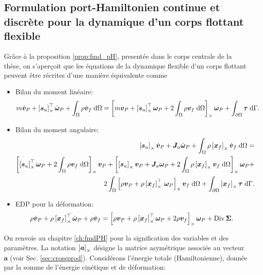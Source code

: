 \subsection*{Formulation port-Hamiltonien continue et discrète pour la dynamique d'un corps flottant flexible}
Grâce à la proposition \ref{prop:fmd_pH}, presentée dans le corps centrale de la thèse, on s'aperçoit que les équations de la dynamique flexible d'un corps flottant \cite[Chapitre 4]{simeon2013computational} peuvent être récrites d'une manière équivalente comme
\begin{itemize}
	\item Bilan du moment linéaire:
	\begin{equation*}
	\begin{split}
	m\dot{\bm{v}}_P + \crmat{\bm{s}_u}^\top \dot{\bm{\omega}}_P +   \int_{\Omega} \rho \dot{\bm{v}}_f \d{\Omega}  = 	\crmat{m {\bm{v}_P} + {\crmat{\bm{s}_u}^\top \bm\omega_P} +2 \int_{\Omega} \rho {\bm{v}_f} \d{\Omega}} \bm\omega_P + \int_{\partial \Omega} \bm\tau \d{\Gamma}.
	\end{split}
	\end{equation*}
	\item Bilan du moment angulaire:
	\begin{equation*}
	\begin{split}
	\crmat{\bm{s}_u} \dot{\bm{v}}_P  + \bm{J}_u \dot{\bm\omega}_P + \int_{\Omega} \rho \crmat{\bm{x}_f} \dot{\bm{v}}_f \d{\Omega} = \\
	\crmat{\crmat{\bm{s}_u}^\top \bm\omega_P + 2 \int_{\Omega} \rho {\bm{v}_f} \d{\Omega}} \bm{v}_P + \crmat{\crmat{\bm{s}_u} \bm{v}_P + {\bm{J}_u \bm\omega_P} + 2 \int_{\Omega} \rho \crmat{\bm{x}_f} {\bm{v}}_f \d{\Omega}} \bm\omega_P + 
	\\
	2 \int_{\Omega} \left[\rho \bm{v}_P + \rho \crmat{\bm{x}_f}^\top \, \bm\omega_P\right]_\times \bm{v}_f \d{\Omega} + \int_{\partial \Omega}\crmat{\bm{x}_f} \bm{\tau} \d{\Gamma}.
	\end{split}
	\end{equation*}
	\item EDP pour la déformation:
	\begin{equation*}
	\rho \dot{\bm{v}}_P + \rho \left[\bm{x}_f\right]_\times^\top \dot{\bm\omega}_P  + \rho \dot{\bm{v}}_f = \left[\rho \bm{v}_P + \rho \left[\bm{x}_f\right]_\times^\top \bm\omega_P + 2 \rho \bm{v}_f\right]_\times \bm\omega_P + \operatorname*{Div}{\bm\Sigma}.
	\end{equation*}
\end{itemize}
On renvoie au chapitre \ref{ch:fmdPH} pour la signification des variables et des paramètres. La notation $\left[\bm{a}\right]_\times$ désigne la matrice asymétrique associée au vecteur $\bm{a} $ (voir Sec. \ref{sec:crossprod}). Considérons l'énergie totale (Hamiltonienne), donnée par la somme de l'énergie cinétique et de déformation:
